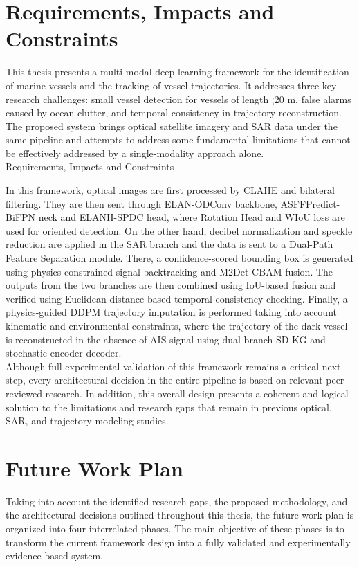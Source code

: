 \section{Requirements, Impacts and
Constraints}
This thesis presents a multi-modal deep learning framework for the identification of marine vessels and the tracking of vessel trajectories. It addresses three key research challenges: small vessel detection for vessels of length ¡20 m, false alarms caused by ocean clutter, and temporal consistency in trajectory reconstruction. The proposed system brings optical satellite imagery and SAR data under the same pipeline and attempts to address some fundamental limitations that cannot be effectively addressed by a single-modality approach alone. \\
Requirements, Impacts and
Constraints

In this framework, optical images are first processed by CLAHE and bilateral filtering. They are then sent through ELAN-ODConv backbone, ASFFPredict-BiFPN neck and ELANH-SPDC head, where Rotation Head and WIoU loss are used for oriented detection. On the other hand, decibel normalization and speckle reduction are applied in the SAR branch and the data is sent to a Dual-Path Feature Separation module. There, a confidence-scored bounding box is generated using physics-constrained signal backtracking and M2Det-CBAM fusion. The outputs from the two branches are then combined using IoU-based fusion and verified using Euclidean distance-based temporal consistency checking. Finally, a physics-guided DDPM trajectory imputation is performed taking into account kinematic and environmental constraints, where the trajectory of the dark vessel is reconstructed in the absence of AIS signal using dual-branch SD-KG and stochastic encoder-decoder. \\


Although full experimental validation of this framework remains a critical next step, every architectural decision in the entire pipeline is based on relevant peer-reviewed research. In addition, this overall design presents a coherent and logical solution to the limitations and research gaps that remain in previous optical, SAR, and trajectory modeling studies. 

\section{Future Work Plan} 
Taking into account the identified research gaps, the proposed methodology, and the architectural decisions outlined throughout this thesis, the future work plan is organized into four interrelated phases. The main objective of these phases is to 
transform the current framework design into a fully validated and experimentally evidence-based system. 


